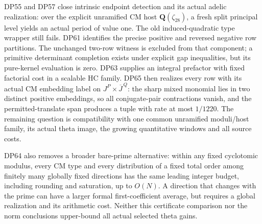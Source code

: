\documentclass[11pt,a4paper]{article}
\theoremstyle{definition}\newtheorem{remark}[theorem]{Remark}
\begin{document}
DP55 and DP57 close intrinsic endpoint detection and its actual adelic realization: over the explicit unramified CM host $\mathbf Q(\zeta_{28})$, a fresh split principal level yields an actual period of value one. The old induced-quadratic type wrapper still fails. DP61 identifies the precise positive and reversed negative row partitions. The unchanged two-row witness is excluded from that component; a primitive determinant completion exists under explicit gap inequalities, but its pure-kernel evaluation is zero. DP63 supplies an integral prefactor with fixed factorial cost in a scalable HC family. DP65 then realizes every row with its actual CM embedding label on $J^P\times\overline J^{\,Q}$: the sharp mixed monomial lies in two distinct positive embeddings, so all conjugate-pair contractions vanish, and the permitted-translate span produces a tuple with rate at most $1/1220$. The remaining question is compatibility with one common unramified moduli/host family, its actual theta image, the growing quantitative windows and all source costs.

DP64 also removes a broader bare-prime alternative: within any fixed cyclotomic modulus, every CM type and every distribution of a fixed total order among finitely many globally fixed directions has the same leading integer budget, including rounding and saturation, up to $O(N)$. A direction that changes with the prime can have a larger formal first-coefficient average, but requires a global realization and its arithmetic cost. Neither this certificate comparison nor the norm conclusions upper-bound all actual selected theta gains.
\end{document}
